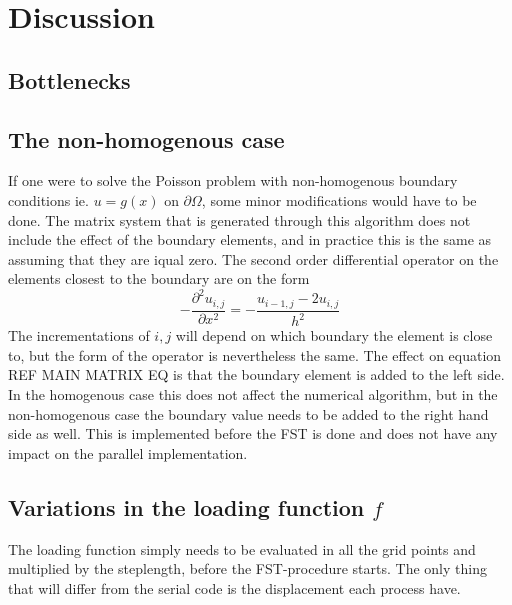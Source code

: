 \section{Discussion}

\subsection{Bottlenecks}

\subsection{The non-homogenous case}
If one were to solve the Poisson problem with non-homogenous boundary conditions ie. $u = g(x) $ on $\partial \Omega$, 
some minor modifications would have to be done. 
The matrix system that is generated through this algorithm does not include the effect of the boundary elements, 
and in practice this is the same as assuming that they are iqual zero. The second order differential operator on the elements 
closest to the boundary are on the form 
\begin{equation}
	-\frac{\partial^2 u_{i,j}}{\partial x^2} = -\frac{u_{i-1,j}-2u_{i,j}}{h^2}
\end{equation}
The incrementations of $i,j$ will depend on which boundary the element is close to, but the form of the operator is nevertheless the same.
The effect on equation REF MAIN MATRIX EQ is that the boundary element is added to the left side.
In the homogenous case this does not affect the numerical algorithm, but in the non-homogenous case the boundary value needs to be added to the 
right hand side as well. This is implemented before the FST is done and does not have any impact on the parallel implementation. 

\subsection{Variations in the loading function $f$}
The loading function simply needs to be evaluated in all the grid points and multiplied by the steplength, before the 
FST-procedure starts. The only thing that will differ from the serial code is the displacement each process have.


